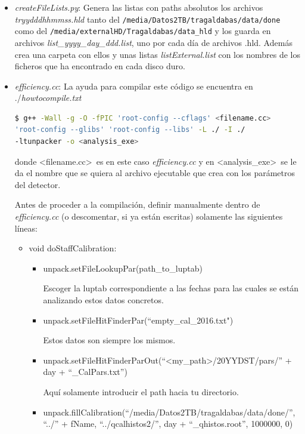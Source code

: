 \documentclass[a4paper]{book}
\begin{document}
\begin{itemize}
	\item \textit{createFileLists.py}: Genera las listas con paths absolutos los archivos \textit{tryydddhhmmss.hld} tanto del \texttt{/media/Datos2TB/tragaldabas/data/done} como del \texttt{/media/externalHD/Tragaldabas/data\_hld} y los guarda en archivos \textit{list\_yyyy\_day\_ddd.list}, uno por cada día de archivos .hld. Además crea una carpeta con ellos y unas listas \textit{listExternal.list} con los nombres de los ficheros que ha encontrado en cada disco duro.
	
	\item \textit{efficiency.cc}: La ayuda para compilar este código se encuentra en ./\textit{howtocompile.txt}
	
		\begin{lstlisting}[language=bash]
$ g++ -Wall -g -O -fPIC 'root-config --cflags' <filename.cc>
'root-config --glibs' 'root-config --libs' -L ./ -I ./ 
-ltunpacker -o <analysis_exe>
	\end{lstlisting}
	donde \textless filename.cc\textgreater\ es en este caso \textit{efficiency.cc} y en \textless analysis\_exe\textgreater\ se le da el nombre que se quiera al archivo ejecutable que crea con los parámetros del detector.
	
	Antes de proceder a la compilación, definir manualmente dentro de \textit{efficiency.cc} (o descomentar, si ya están escritas) solamente las siguientes líneas:
	\begin{itemize}
	\item void doStaffCalibration:
		\begin{itemize}
			\item unpack.setFileLookupPar(path\_to\_luptab)
		
			Escoger la luptab correspondiente a las fechas para las cuales se están analizando estos datos concretos.
			\item unpack.setFileHitFinderPar(``empty\_cal\_2016.txt")
		
			Estos datos son siempre los mismos.
			\item unpack.setFileHitFinderParOut(``\textless my\_path\textgreater /20YYDST/pars/'' + day + ``\_CalPars.txt'')
		
			Aquí solamente introducir el path hacia tu directorio.
			\item unpack.fillCalibration(``/media/Datos2TB/tragaldabas/data/done/'', ``../'' + fName, ``../qcalhistos2/'', day + ``\_qhistos.root'', 1000000, 0)
		

\end{itemize}
\end{itemize}
\end{itemize}
\end{document}
